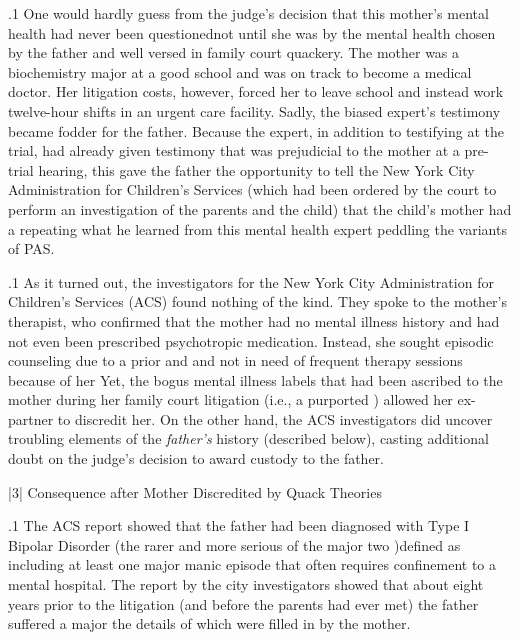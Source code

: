 \documentclass[11pt, twoside]{article}
\begin{document}
{\p.1{%
One would hardly guess from the judge’s decision that this mother’s
mental health had never been questioned\mdash{}not until she was  by the mental health  chosen by the father and well versed
in family court quackery. The mother was a biochemistry major at a
good school and was on track to become a medical doctor. Her litigation
costs, however, forced her to leave school and instead work twelve-hour
shifts in an urgent care facility. Sadly, the biased expert’s testimony became fodder for the father. Because the expert, in addition to testifying at
the trial, had already given testimony that was prejudicial to the mother
at a pre-trial hearing, this gave the father the opportunity to tell the New
York City Administration for Children’s Services (which had been ordered by the court to perform an investigation of the parents and the
child) that the child’s mother had a  repeating
what he learned from this mental health
expert peddling the variants of PAS.
}%

\p.1{%
As it turned out, the investigators for the New York City Administration for Children’s Services (ACS) found nothing of the kind. They
spoke to the mother’s therapist, who confirmed that the mother had no
mental illness history and had not even been prescribed psychotropic
medication. Instead, she sought episodic counseling due to a prior  and \mdash{}and not in need of frequent therapy sessions because of her 
Yet, the bogus mental illness labels that had been ascribed to the mother
during her family court litigation (i.e., a purported ) allowed her ex-partner to discredit her. On the other hand, the
ACS investigators did uncover troubling elements of the \textit{father’s} history
(described below), casting additional doubt on the judge’s decision to
award custody to the father.
}%


\s|3|{
 Consequence after Mother Discredited by Quack Theories}

\p.1{%
\noindent{}The ACS report showed that the father had been diagnosed with Type I
Bipolar Disorder (the rarer and more serious of the major
two )\mdash{}defined as including at least one major manic episode that often requires
confinement to a mental hospital. The report by the city investigators
showed that about eight years prior to the litigation (and before the parents had ever met) the father suffered a major \mdash{}the
details of which were filled in by the mother.
}%

}
\end{document}
